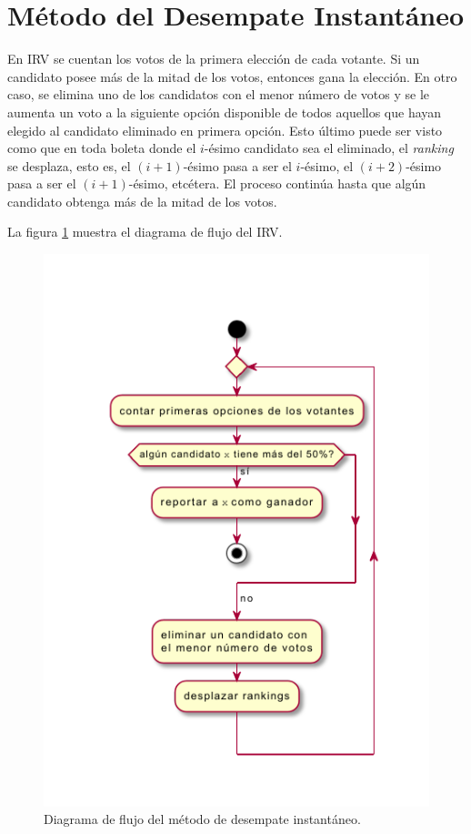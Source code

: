 \section{M\'etodo del Desempate Instant\'aneo}\label{sec:irv}
En IRV se cuentan los votos de la primera elecci\'on de cada votante. Si un candidato posee m\'as de la mitad de  los votos, entonces gana la elecci\'on. En otro caso, se elimina uno de los candidatos con el menor n\'umero de votos y se le aumenta un voto a la siguiente opci\'on disponible de todos aquellos que hayan elegido al candidato eliminado en primera opci\'on. Esto \'ultimo puede ser visto como que en toda boleta donde el $i$-\'esimo candidato sea el eliminado, el \textit{ranking} se desplaza, esto es, el $(i+1)$-\'esimo pasa a ser el $i$-\'esimo, el $(i+2)$-\'esimo pasa a ser el $(i+1)$-\'esimo, etc\'etera. El proceso contin\'ua hasta que alg\'un candidato obtenga m\'as de la mitad de los votos. 

La figura \ref{fig:irv} muestra el diagrama de flujo del IRV.

\begin{figure}[!h]
    \centering
    \includegraphics[scale=1.4]{Graphics/irv.pdf}
    \caption{Diagrama de flujo del m\'etodo de desempate instant\'aneo.}
    \label{fig:irv}
\end{figure}

